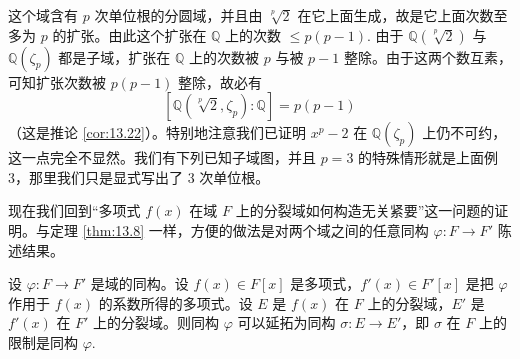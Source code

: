 这个域含有 \(p\) 次单位根的分圆域，并且由 \(\sqrt[p]{2}\) 在它上面生成，故是它上面次数至多为 \(p\) 的扩张。由此这个扩张在 \(\mathbb{Q}\) 上的次数 \(\leq p(p-1)\). 由于 \(\mathbb{Q}(\sqrt[p]{2})\) 与 \(\mathbb{Q}(\zeta_p)\) 都是子域，扩张在 \(\mathbb{Q}\) 上的次数被 \(p\) 与被 \(p-1\) 整除。由于这两个数互素，可知扩张次数被 \(p(p-1)\) 整除，故必有
\[
[\mathbb{Q}(\sqrt[p]{2}, \zeta_p):\mathbb{Q}] = p(p-1)
\]
（这是推论 \ref{cor:13.22}）。特别地注意我们已证明 \(x^p-2\) 在 \(\mathbb{Q}(\zeta_p)\) 上仍不可约，这一点完全不显然。我们有下列已知子域图，并且 \(p = 3\) 的特殊情形就是上面例 3，那里我们只是显式写出了 3 次单位根。

现在我们回到“多项式 \(f(x)\) 在域 \(F\) 上的分裂域如何构造无关紧要”这一问题的证明。与定理 \ref{thm:13.8} 一样，方便的做法是对两个域之间的任意同构 \(\varphi : F \to F'\) 陈述结果。

\begin{theorem}\label{thm:13.27}
设 \(\varphi : F \to F'\) 是域的同构。设 \(f(x) \in F[x]\) 是多项式，\(f'(x) \in F'[x]\) 是把 \(\varphi\) 作用于 \(f(x)\) 的系数所得的多项式。设 \(E\) 是 \(f(x)\) 在 \(F\) 上的分裂域，\(E'\) 是 \(f'(x)\) 在 \(F'\) 上的分裂域。则同构 \(\varphi\) 可以延拓为同构 \(\sigma : E \to E'\)，即 \(\sigma\) 在 \(F\) 上的限制是同构 \(\varphi\).
\end{theorem}

